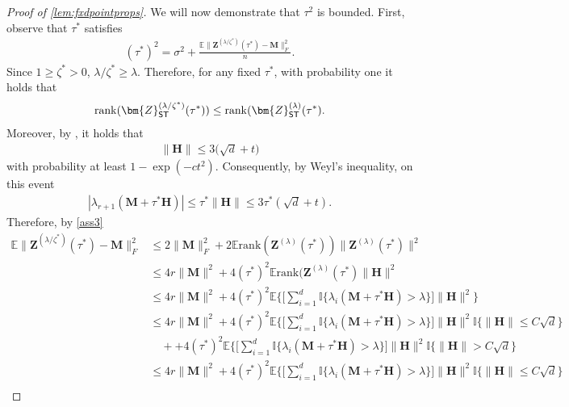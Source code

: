 \documentclass[10pt]{article}
\newcommand{\s}{^*}
\theoremstyle{definition}
\begin{document}
\begin{proof}[Proof of \cref{lem:fxdpointprops}]
We will now demonstrate that $\tau^2$ is bounded.  First, observe that $\tau\s$ satisfies 
\begin{align}
    (\tau\s)^2 = \sigma^2 + \frac{\mathbb{E}\| \bm{Z}^{(\lambda/\zeta\s)}(\tau\s) - \bm{M} \|_F^2}{n}.  
\end{align}
Since $1 \geq \zeta\s > 0$, $\lambda/\zeta\s \geq \lambda$.  Therefore, for any fixed $\tau\s$, with probability one it holds that
\begin{align}
    \mathrm{rank}(\bm{Z}^{(\lambda/\zeta\s)}_{{\sf ST}}(\tau\s)) \leq \mathrm{rank}(\bm{Z}^{(\lambda)}_{{\sf ST}}(\tau\s).
\end{align}
Moreover, by \citet{bandeira_sharp_2016}, it holds that
\begin{align}
    \| \bm{H} \| \leq 3 \big( \sqrt{d} +  t \big)
\end{align}
with probability at least $1 - \exp( - c t^2 )$.  Consequently, by Weyl's inequality, on this event
\begin{align}
    |\lambda_{r+1}( \bm{M} + \tau\s \bm{H} ) | \leq \tau\s \| \bm{H} \| \leq 3 \tau\s (\sqrt{d} + t ).
\end{align}
Therefore, by \cref{ass3}
\begin{align}
    \mathbb{E} \| \bm{Z}^{(\lambda/\zeta\s)}(\tau\s) - \bm{M} \|_F^2 &\leq 2 \| \bm{M} \|_F^2 + 2\mathbb{E} \mathrm{rank}(\bm{Z}^{(\lambda)}(\tau\s))\| \bm{Z}^{(\lambda)}(\tau\s)\|^2 \\
    &\leq 4 r \| \bm{M} \|^2 + 4(\tau\s)^2 \mathbb{E} \mathrm{rank}(\bm{Z}^{(\lambda)}(\tau\s) \| \bm{H} \|^2 \\
    &\leq 4 r \| \bm{M} \|^2 + 4 (\tau\s)^2 \mathbb{E} \bigg\{ \bigg[ \sum_{i=1}^{d} \mathbb{I}\{ \lambda_i( \bm{M} + \tau\s \bm{H}) > \lambda \} \bigg]  \| \bm{H} \|^2 \bigg\}\\
    &\leq 4 r \| \bm{M} \|^2 + 4 (\tau\s)^2 \mathbb{E} \bigg\{ \bigg[ \sum_{i=1}^{d} \mathbb{I}\{ \lambda_i( \bm{M} + \tau\s \bm{H}) > \lambda \} \bigg]  \| \bm{H} \|^2  \mathbb{I}\{ \| \bm{H} \| \leq C \sqrt{d} \bigg\} \\
    &\quad ++ 4 (\tau\s)^2 \mathbb{E} \bigg\{ \bigg[ \sum_{i=1}^{d} \mathbb{I}\{ \lambda_i( \bm{M} + \tau\s \bm{H}) > \lambda \} \bigg]  \| \bm{H} \|^2  \mathbb{I}\{ \| \bm{H} \| > C \sqrt{d} \bigg\} \\
    &\leq 4 r \| \bm{M} \|^2 + 4 (\tau\s)^2 \mathbb{E} \bigg\{ \bigg[ \sum_{i=1}^{d} \mathbb{I}\{ \lambda_i( \bm{M} + \tau\s \bm{H}) > \lambda \} \bigg]  \| \bm{H} \|^2  \mathbb{I}\{ \| \bm{H} \| \leq C \sqrt{d} \bigg\} \\

\end{align}
\end{proof}
\end{document}
